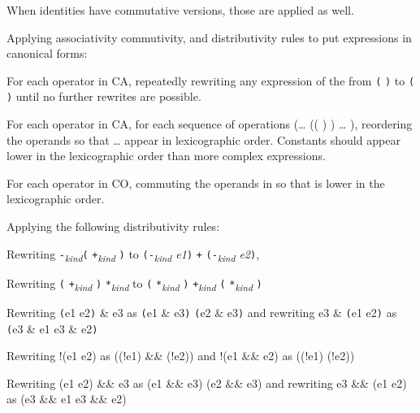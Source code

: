 \begin{compactenum}
\begin{compactenum}
    When identities have commutative versions, those are applied as
    well.
  \end{compactenum}
\item
  Applying associativity commutivity, and distributivity rules to put
  expressions in canonical forms:
\begin{compactenum}
\item
  For each operator  in CA, repeatedly rewriting any expression
  of the from   \texttt{(} 
  \texttt{)} to \texttt{(} 
  \texttt{)}   until no further rewrites are
  possible.
\item
  For each operator  in CA, for each sequence of operations
  (\ldots{} ((  )  )
  \ldots{}  ), reordering the operands so that
   \ldots{}  appear in lexicographic order. Constants
  should appear lower in the lexicographic order than more complex
  expressions.
\item
  For each operator  in CO, commuting the operands in 
    so that  is lower in the lexicographic
  order.
\item
  Applying the following distributivity rules:

  \begin{compactenum}
  \item
    Rewriting \texttt{-}\emph{\textsubscript{kind}}\texttt{(}
    \texttt{+}\emph{\textsubscript{kind}} \texttt{)} to
    \texttt{(-}\emph{\textsubscript{kind} e1}\texttt{)} \texttt{+}
    \texttt{(-}\emph{\textsubscript{kind} e2}\texttt{)},
  \item
    Rewriting \texttt{(} \texttt{+}\emph{\textsubscript{kind}}
    \texttt{)} \texttt{*}\emph{\textsubscript{kind}} 
    to \texttt{(} \texttt{*}\emph{\textsubscript{kind}}
    \texttt{)} \texttt{+}\emph{\textsubscript{kind}}
    \texttt{(} \texttt{*}\emph{\textsubscript{kind}}
    \texttt{)}
  \item
    Rewriting \texttt{(}e1 \textbar{} e2\texttt{)} \& e3 as \texttt{(}e1
    \& e3\texttt{)} \textbar{} \texttt{(}e2 \& e3\texttt{)} and
    rewriting e3 \& \texttt{(}e1 \textbar{} e2\texttt{)} as \texttt{(}e3
    \& e1 \textbar{} e3 \& e2\texttt{)}
  \item
    Rewriting !(e1 \textbar{}\textbar{} e2) as ((!e1) \&\& (!e2)) and
    !(e1 \&\& e2) as ((!e1) \textbar{}\textbar{} (!e2))
  \item
    Rewriting (e1 \textbar{}\textbar{} e2) \&\& e3 as (e1 \&\& e3)
    \textbar{}\textbar{} (e2 \&\& e3) and rewriting e3 \&\& (e1
    \textbar{}\textbar{} e2) as (e3 \&\& e1 \textbar{}\textbar{} e3 \&\&
    e2)
  \end{compactenum}
\end{compactenum}
\end{compactenum}

